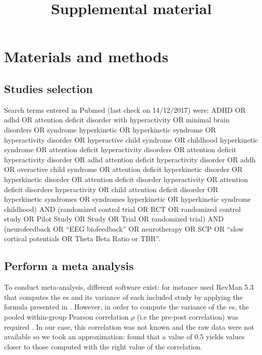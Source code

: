 \documentclass[12pt,a4paper,english]{article}
\begin{document}
\title{Supplemental material}
\date{}
\maketitle

\section{Materials and methods}

\subsection{Studies selection}

Search terms entered in Pubmed (last check on 14/12/2017) were: 
\guillemotleft ADHD OR adhd OR attention deficit disorder with hyperactivity OR minimal brain disorders OR syndrome hyperkinetic OR hyperkinetic
syndrome OR hyperactivity disorder OR hyperactive child syndrome OR childhood hyperkinetic syndrome OR attention deficit hyperactivity disorders
OR attention deficit hyperactivity disorder OR adhd attention deficit hyperactivity disorder OR addh OR overactive child syndrome OR attention deficit hyperkinetic 
disorder OR hyperkinetic disorder OR attention deficit disorder hyperactivity OR attention deficit disorders hyperactivity OR child attention deficit disorder 
OR hyperkinetic syndromes OR syndromes hyperkinetic OR hyperkinetic syndrome childhood) AND (randomized control trial OR RCT OR randomized control study OR Pilot
Study OR Study OR Trial OR randomized trial) AND (neurofeedback OR “EEG biofeedback” OR neurotherapy OR SCP OR “slow cortical potentials OR Theta Beta Ratio or TBR”\guillemotright.


\subsection{Perform a meta analysis}

To conduct meta-analysis, different software exist: for instance \citet{Cortese2016} used RevMan 5.3 \citep{RevMan} that computes the \gls{es} and its 
variance of each included study by applying the formula presented in \citet{Morris2008}. However, in order to compute the variance of the \gls{es}, 
the pooled within-group Pearson correlation $\rho$ (i.e the pre-post correlation) was required 
\citep{James2013}. In our case, this correlation was not known and the raw data were not available so we took an
 approximation: \citet{Balk2012} found that a value of 0.5 yields values closer to those computed with the right value of the correlation. 
\end{document}
